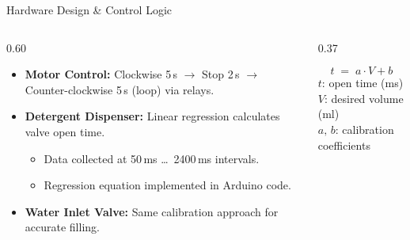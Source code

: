 \documentclass[aspectratio=169]{beamer}
\begin{document}
\begin{frame}{Hardware Design \& Control Logic}
\begin{columns}[T]
\begin{column}{0.60\textwidth}
\begin{itemize}
  \item \textbf{Motor Control:}
    Clockwise 5\,s $\rightarrow$ Stop 2\,s $\rightarrow$ Counter-clockwise 5\,s
    (loop) via relays.
  \item \textbf{Detergent Dispenser:} Linear regression calculates valve open time.
  \begin{itemize}
    \item Data collected at 50\,ms \dots\ 2400\,ms intervals.
    \item Regression equation implemented in Arduino code.
  \end{itemize}
  \item \textbf{Water Inlet Valve:} Same calibration approach for accurate filling.
\end{itemize}
\end{column}
\begin{column}{0.37\textwidth}
\begin{tcolorbox}[mycard, title={\faCalculator\enspace Regression Model}]
\centering\small
\[
  t \;=\; a \cdot V + b
\]
\scriptsize
$t$: open time (ms)\\
$V$: desired volume (ml)\\
$a,\,b$: calibration coefficients
\end{tcolorbox}
\end{column}
\end{columns}
\end{frame}
\end{document}
